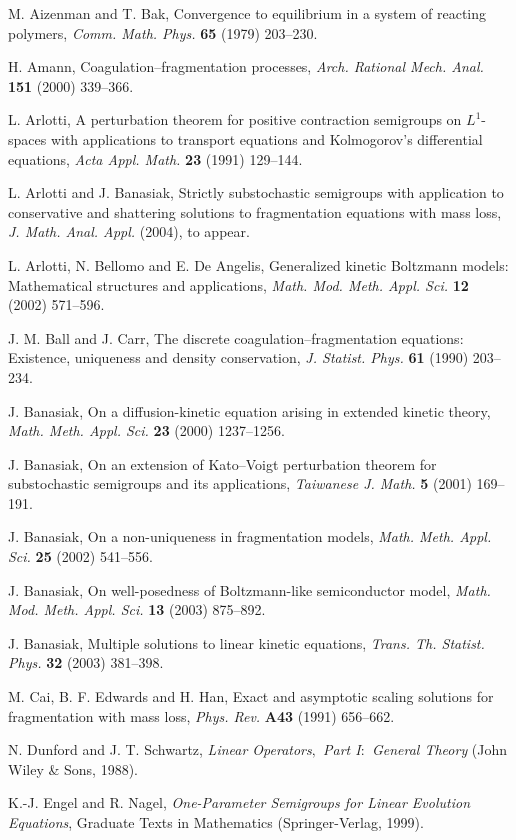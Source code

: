 \documentclass{ws-m3as}
\begin{document}
\begin{thebibliography}{00}
 M. Aizenman and T. Bak, Convergence to equilibrium
in a system of reacting polymers, {\it Comm. Math. Phys.} {\bf 65}
(1979) 203--230.

 H. Amann, Coagulation--fragmentation
processes, {\it Arch. Rational Mech. Anal.} {\bf 151} (2000)
339--366.

 L. Arlotti, A perturbation theorem for
positive contraction semigroups on $L^1$-spaces with applications to
transport equations and Kolmogorov's differential equations,
{\it Acta Appl. Math.} {\bf 23} (1991) 129--144.

 L. Arlotti and J. Banasiak, Strictly substochastic
semigroups with application to conservative and
shattering solutions to fragmentation equations with mass loss,\break
{\it J. Math. Anal. Appl.} (2004), to appear.

 L. Arlotti, N. Bellomo and E. De Angelis,
Generalized kinetic Boltzmann models: Mathematical structures and
applications, {\it Math. Mod. Meth. Appl. Sci.} {\bf 12} (2002)
571--596.

 J. M. Ball and J. Carr, The discrete
coagulation--fragmentation equations: Existence, uniqueness and
density conservation, {\it J. Statist. Phys.} {\bf 61} (1990)
203--234.

 J. Banasiak, On a diffusion-kinetic equation
arising in extended kinetic theory, {\it Math. Meth.
Appl. Sci.} {\bf 23} (2000) 1237--1256.

 J. Banasiak, On an extension of Kato--Voigt
perturbation theorem for substochastic semigroups and its
applications, {\it Taiwanese J. Math.} {\bf 5}
(2001) 169--191.

 J. Banasiak, On a non-uniqueness in
fragmentation models, {\it Math. Meth. Appl. Sci.}
{\bf 25} (2002) 541--556.

 J. Banasiak, On well-posedness of Boltzmann-like
semiconductor model, {\it Math. Mod. Meth. Appl. Sci.} {\bf 13}
(2003) 875--892.

 J. Banasiak, Multiple solutions to linear kinetic
equations, {\it Trans. Th. Statist. Phys.} {\bf 32} (2003) 381--398.

 M. Cai, B. F. Edwards and H. Han,
Exact and asymptotic scaling solutions
for fragmentation with mass loss, {\it Phys. Rev.} {\bf A43} (1991) 656--662.

 N. Dunford and J. T. Schwartz, {\it Linear Operators$,$
Part I\/$:$ General Theory} (John Wiley \& Sons, 1988).

 K.-J. Engel and R. Nagel, {\it One-Parameter Semigroups
for Linear Evolution Equations}, Graduate Texts in Mathematics
(Springer-Verlag, 1999).

\end{thebibliography}
\end{document}
